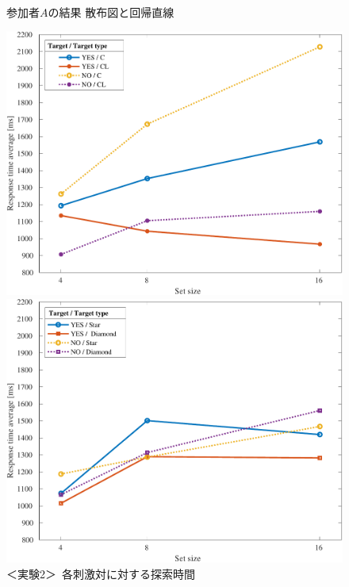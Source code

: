 \begin{figure}[H]
\begin{minipage}[b]{.49\textwidth}
        \caption{参加者\(A\)の結果 散布図と回帰直線}
        \label{fig:平均値と回帰直線}
    \end{minipage}
\end{figure}
\begin{figure}[H]
    \centering
    \begin{minipage}[b]{.49\textwidth}
        \centering
        \includegraphics[keepaspectratio,width=\textwidth]{../../Figures/13_01_graph.pdf}
    \end{minipage}
    \begin{minipage}[b]{.49\textwidth}
        \centering
        \includegraphics[keepaspectratio,width=\textwidth]{../../Figures/13_02_graph.pdf}
    \end{minipage}
    \caption{＜実験2＞\ 各刺激対に対する探索時間}
    \label{fig:刺激対の刺激数に対する探索時間}
\end{figure}
